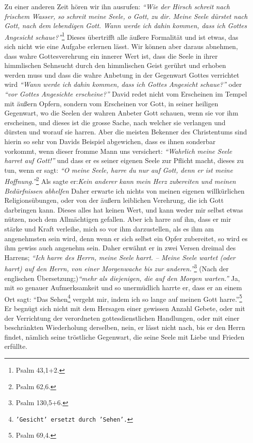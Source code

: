  Zu einer anderen Zeit hören wir ihn
ausrufen:
\textit{"`Wie der Hirsch schreit nach
frischem Wasser, so schreit meine Seele, o Gott, zu dir. Meine Seele dürstet
nach Gott, nach dem lebendigen Gott. Wann werde ich dahin kommen, dass ich
Gottes Angesicht schaue?"'}\footnote{Psalm 43,1+2.}
Dieses übertrifft alle äußere
Formalität und ist etwas, das sich nicht wie eine
Aufgabe erlernen lässt. Wir
können aber daraus abnehmen, dass wahre Gottesverehrung ein innerer Wert ist,
dass die Seele in ihrer himmlischen Sehnsucht durch den himmlischen Geist
gerührt und erhoben werden muss und dass die wahre Anbetung in der Gegenwart
Gottes verrichtet wird
\textit{"`Wann werde ich dahin kommen, dass ich Gottes
Angesicht schaue?"'} oder \textit{"`vor Gottes Angesichte erscheine?"'} David
redet nicht
vom Erscheinen im Tempel mit äußern Opfern, sondern
vom Erscheinen vor Gott, in
seiner heiligen Gegenwart, wo die Seelen der wahren Anbeter Gott schauen, wenn
sie vor ihm erscheinen, und dieses ist die grosse Sache, nach welcher sie
verlangen und dürsten und worauf sie harren. Aber die meisten Bekenner des
Christentums sind hierin so sehr von Davids Beispiel abgewichen, dass es ihnen
sonderbar vorkommt, wenn dieser fromme Mann uns versichert:
\textit{"`Wahrlich meine Seele harret auf Gott!"'}
und dass er es seiner eigenen Seele zur Pflicht macht,
dieses zu tun, wenn er sagt:
\textit{"`O meine Seele, harre du nur auf Gott, denn er ist meine
Hoffnung."'}\footnote{Psalm 62,6.}
Als sagte er:\textit{Kein anderer kann mein Herz
zubereiten und meinen Bedürfnissen abhelfen} Daher erwarte ich nichts von meinen
eigenen willkürlichen Religionsübungen,
oder von der äußern leiblichen
Verehrung, die ich Gott darbringen kann. Dieses alles hat keinen Wert, und kann
weder mir selbst etwas nützen, noch dem Allmächtigen gefallen. Aber ich
harre auf ihn, dass er mir stärke und Kraft verleihe, mich so vor ihm
darzustellen, als es ihm am angenehmsten sein wird, denn wenn er sich selbst ein
Opfer zubereitet, so wird es ihm gewiss auch angenehm
sein. Daher erwähnt er in
zwei Versen dreimal des Harrens;
\textit{"`Ich harre des Herrn, meine Seele harrt. --
Meine Seele wartet (oder harrt) auf den Herrn, von einer Morgenwache bis zur
anderen."'}\footnote{Psalm 130,5+6.}
(Nach der englischen Übersetzung;)\textit{"`mehr als
diejenigen, die auf den Morgen warten."'} Ja, mit so genauer Aufmerksamkeit und
so unermüdlich harrte er, dass er an einem Ort sagt:
"`Das Sehen\footnote{\texttt{'Gesicht' ersetzt durch 'Sehen'.}} vergeht mir,
indem ich so lange auf meinen Gott harre."'\footnote{Psalm 69,4.}
Er begnügt sich
nicht mit dem Hersagen einer gewissen Anzahl Gebete,
oder mit der Verrichtung
der verordneten gottesdienstlichen Handlungen, oder mit einer beschränkten
Wiederholung derselben, nein, er lässt nicht nach, bis er den Herrn findet,
nämlich seine tröstliche Gegenwart, die seine Seele mit Liebe und Frieden
erfüllte.

